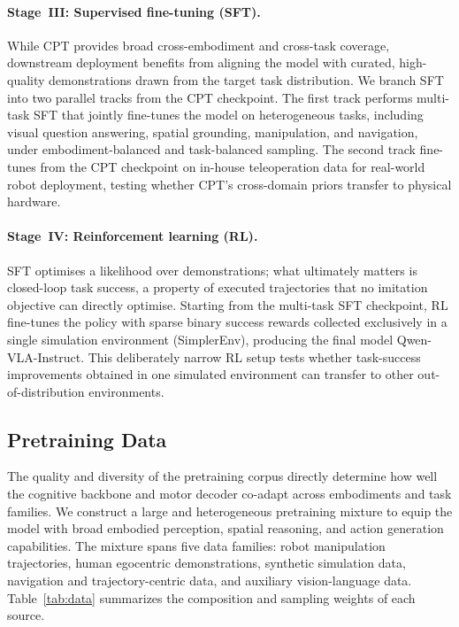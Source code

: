 \documentclass{llmxive}
\begin{document}
  
  \paragraph{Stage~III: Supervised fine-tuning (SFT).}
  While CPT provides broad cross-embodiment and cross-task coverage,
  downstream deployment benefits from aligning the model with curated,
  high-quality demonstrations drawn from the target task distribution.
  We branch SFT into two parallel tracks from the CPT checkpoint.
  The first track performs multi-task SFT that jointly fine-tunes the model on heterogeneous tasks, including visual
  question answering, spatial grounding, manipulation, and navigation, under
  embodiment-balanced and task-balanced sampling.
  The second track fine-tunes from the CPT checkpoint on in-house
  teleoperation data for real-world robot deployment, testing whether CPT's
  cross-domain priors transfer to physical hardware.

  \paragraph{Stage~IV: Reinforcement learning (RL).}
  SFT optimises a likelihood over demonstrations; what ultimately matters is
  closed-loop task success, a property of executed trajectories that no
  imitation objective can directly optimise.
  Starting from the multi-task SFT checkpoint, RL
  fine-tunes the policy with sparse binary success rewards collected
  exclusively in a single simulation environment (SimplerEnv), producing the
  final model Qwen-VLA-Instruct.
  This deliberately narrow RL setup tests whether task-success improvements
  obtained in one simulated environment can transfer to other
  out-of-distribution environments.
  
\subsection{Pretraining Data}
\label{sec:data}

The quality and diversity of the pretraining corpus directly determine how well
the cognitive backbone and motor decoder co-adapt across embodiments and task
families.
We construct a large and heterogeneous pretraining mixture to equip the model
with broad embodied perception, spatial reasoning, and action generation
capabilities.
The mixture spans five data families: robot manipulation trajectories, human
egocentric demonstrations, synthetic simulation data, navigation and
trajectory-centric data, and auxiliary vision-language data.
Table~\ref{tab:data} summarizes the composition and sampling weights of each
source.
\end{document}
